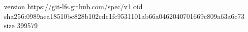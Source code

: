 version https://git-lfs.github.com/spec/v1
oid sha256:0989aea18510bc828b102cdc1fc9531101ab66a0462040701669c809a63a6c73
size 399579
